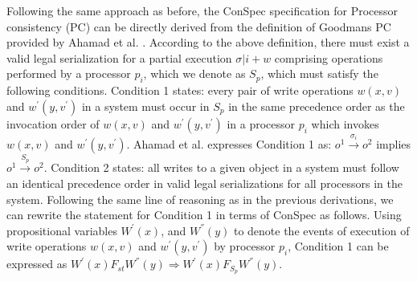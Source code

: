 \documentclass[acmlarge, ,11pt]{acmart}
\begin{document}
 \par %
   Following the same approach as before, the ConSpec specification for Processor consistency (PC)  can be directly derived from the definition of Goodman\textquotesingle s PC provided by Ahamad et al. \cite{Ahamad:1993:PPC:165231.165264}.
 According to the above definition, there must exist a valid legal serialization for a partial execution  $\sigma |i + w$ comprising operations performed by a processor $p_i$, which we denote as $S_p$, which must satisfy the following conditions.
 Condition 1 states: every pair of write operations $w(x,v)$ and $w^{'}(y,v^{'})$ in a system must occur in $S_p$ in the same precedence order as the invocation order of $w(x,v)$ and $w^{'}(y,v^{'})$ in a processor $p_i$ which invokes $w(x,v)$ and $w^{'}(y,v^{'})$.  Ahamad et al. expresses Condition 1 as:
 $\mathit{o}^1 \xrightarrow{\sigma_i} \mathit{o}^2$ implies $\mathit{o}^1 \xrightarrow{S_p} \mathit{o}^2$. Condition 2 states: all writes to a given object in a system must follow an identical precedence order in valid legal serializations for all processors in the system. %
  Following the same line of reasoning as in the previous derivations, we can rewrite the statement for Condition 1 in terms of ConSpec as follows.  Using propositional variables  $W^{'}(x) $, and $W^{''} (y) $ to denote the events of execution of write operations $w(x,v)$ and  $w^{'}(y,v^{'})$ by processor $p_i$, Condition 1 can be expressed as $W^{'}(x) F_\mathit{st}  W^{''} (y) \Rightarrow W^{'}(x) F_\mathit{S_p}  W^{''} (y) $.
\end{document}
